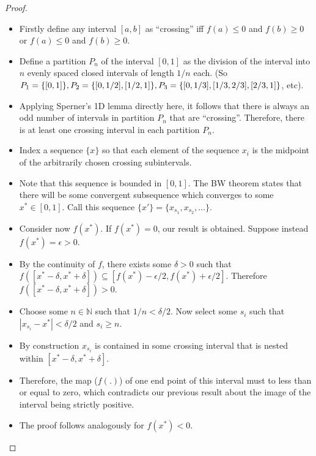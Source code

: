 \documentclass[12pt]{article}
\newcommand{\N}{\mathbb{N}}
\begin{document}
\begin{proof}

    \begin{itemize}
        \item Firstly define any interval $[a,b]$ as ``crossing'' iff $f(a) \leq 0$ and $f(b) \geq 0$ or $f(a) \leq 0$ and $f(b) \geq 0$.
        \item Define a partition $P_n$ of the interval $[0,1]$ as the division of the interval into $n$ evenly spaced closed intervals of length $1/n$ each. (So $P_1 = \{[0,1]\}, P_2 = \{[0,1/2], [1/2,1]\}, \\P_3 = \{[0,1/3],[1/3,2/3], [2/3,1]\}$, etc).
        \item Applying Sperner's 1D lemma directly here, it follows that there is always an odd number of intervals in partition $P_n$ that are ``crossing''. Therefore, there is at least one crossing interval in each partition $P_n$.
        \item Index a sequence $\{x\}$ so that each element of the sequence $x_i$ is the midpoint of the arbitrarily chosen crossing subintervals. 
        \item Note that this sequence is bounded in $[0,1]$. The BW theorem states that there will be some convergent subsequence which converges to some $x^* \in [0,1]$. Call this sequence $\{x'\} = \{x_{s_1}, x_{s_2}, \ldots\}$.
        \item Consider now $f(x^*)$. If $f(x^*)=0$, our result is obtained. Suppose instead $f(x^*)=\epsilon>0$.
        \item By the continuity of $f$, there exists some $\delta > 0$ such that $f([x^*-\delta, x^*+\delta]) \subseteq [f(x^*)-\epsilon/2, f(x^*)+\epsilon/2]$. Therefore $f([x^*-\delta, x^*+\delta]) > 0$.
        \item Choose some $n \in \N$ such that $1/n < \delta/2$. Now select some $s_i$ such that $|x_{s_i} - x^*|<\delta/2$ and $s_i \geq n$.
        \item By construction $x_{s_i}$ is contained in some crossing interval that is nested within $[x^*-\delta, x^*+\delta]$.
        \item Therefore, the map ($f(.)$) of one end point of this interval must to less than or equal to zero, which contradicts our previous result about the image of the interval being strictly positive.
        \item The proof follows analogously for $f(x^*) < 0$.
    \end{itemize}

\end{proof}
\end{document}
